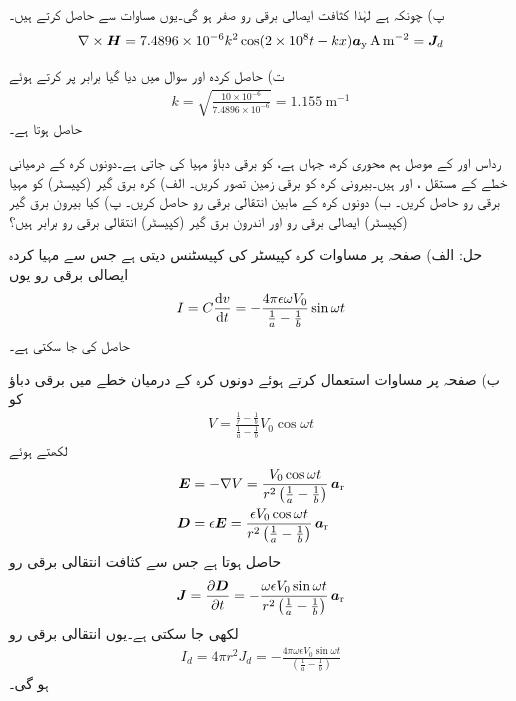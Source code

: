 پ) چونکہ  ہے لہٰذا کثافت ایصالی برقی رو صفر ہو گی۔یوں مساوات  سے  حاصل کرتے ہیں۔
\begin{align*}
\nabla \times {\ensuremath{{\boldsymbol{H}}}}=7.4896 \times 10^{-6} k^2 \cos (2\times 10^8 t - k x) {\boldsymbol{a}}_{\textup{y}} \, \si{\ampere\per\meter\squared}={{\boldsymbol{J}}}_d
\end{align*}

ت) حاصل کردہ اور سوال میں دیا گیا  برابر پر کرتے ہوئے
\begin{align*}
k=\sqrt{\frac{10\times 10^{-6}}{7.4896\times 10^{-6}}}=\SI{1.155}{\meter^{-1}}
\end{align*}
حاصل ہوتا ہے۔

رداس  اور  کے موصل ہم محوری کرہ، جہاں  ہے، کو برقی دباؤ  مہیا کی جاتی ہے۔دونوں کرہ کے درمیانی خطے کے مستقل ،  اور  ہیں۔بیرونی کرہ کو برقی زمین تصور کریں۔ الف)  کرہ برق گیر (کپیسٹر)  کو مہیا برقی رو حاصل کریں۔ ب) دونوں کرہ کے مابین انتقالی برقی رو حاصل کریں۔ پ) کیا بیرون برق گیر (کپیسٹر)  ایصالی برقی رو اور اندرون برق گیر (کپیسٹر)  انتقالی برقی رو برابر ہیں؟

حل: الف) صفحہ  پر مساوات  کرہ کپیسٹر کی کپیسٹنس دیتی ہے جس سے مہیا کردہ ایصالی برقی رو یوں
\begin{align*}
I=C\frac{\dif v}{\dif t}=-\frac{4\pi\epsilon \omega V_0}{\frac{1}{a}-\frac{1}{b}} \sin \omega t
\end{align*}
حاصل کی جا سکتی ہے۔

ب) صفحہ  پر مساوات  استعمال کرتے ہوئے دونوں کرہ کے درمیان خطے میں برقی دباؤ کو
\begin{align*}
V=\frac{\frac{1}{r}-\frac{1}{b}}{\frac{1}{a}-\frac{1}{b}} V_0 \cos \omega t
\end{align*}
لکھتے ہوئے 
\begin{align*}
{\ensuremath{{\boldsymbol{E}}}}&=-\nabla V=\frac{V_0 \cos \omega t}{r^2\left(\frac{1}{a}-\frac{1}{b}\right)}  \, {\boldsymbol{a}}_{\textup{r}}\\
{{\boldsymbol{D}}}&=\epsilon {\ensuremath{{\boldsymbol{E}}}}=\frac{\epsilon V_0 \cos \omega t}{r^2\left(\frac{1}{a}-\frac{1}{b}\right)} \, {\boldsymbol{a}}_{\textup{r}}
\end{align*}
حاصل ہوتا ہے جس سے کثافت انتقالی برقی رو  
\begin{align*}
{\ensuremath{{\boldsymbol{J}}}}=\frac{\partial {\ensuremath{{\boldsymbol{D}}}}}{\partial t}=-\frac{\omega \epsilon V_0 \sin \omega t}{r^2\left(\frac{1}{a}-\frac{1}{b}\right)} \, {\boldsymbol{a}}_{\textup{r}}
\end{align*}
لکھی جا سکتی ہے۔یوں انتقالی برقی رو
\begin{align*}
I_d=4\pi r^2 J_d=-\frac{4 \pi \omega \epsilon V_0 \sin \omega t}{\left(\frac{1}{a}-\frac{1}{b}\right)} 
\end{align*}
ہو گی۔


